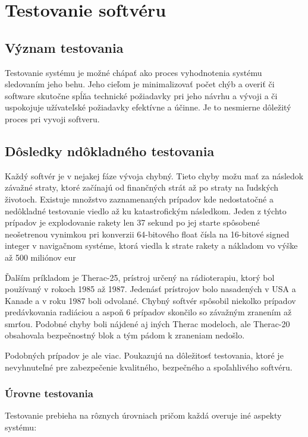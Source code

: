 \chapter{Testovanie softvéru}

\section{Význam testovania}

Testovanie systému je možné chápať ako proces vyhodnotenia systému sledovaním jeho behu. Jeho cieľom je minimalizovať počet chýb a overiť  či software skutočne spĺňa technické požiadavky pri jeho návrhu a vývoji a či uspokojuje užívateľské požiadavky efektívne a účinne. Je to nesmierne dôležitý proces pri vyvoji softveru.


\section{Dôsledky ndôkladného testovania}
Každý softvér je v nejakej fáze vývoja chybný. Tieto chyby možu mať za následok závažné straty, ktoré začínajú od finančných strát až po straty na ľudských životoch. Existuje množstvo zaznamenaných prípadov kde nedostatočné a nedôkladné testovanie viedlo až ku katastrofickým následkom.
Jeden z týchto prípadov je explodovanie rakety len 37 sekund po jej starte spôsobené neošetrenou vynimkou pri konverzii 64-bitového float čísla na 16-bitové signed integer v navigačnom systéme, ktorá viedla k strate rakety a nákladom vo výške až 500 miliónov eur\cite{Smrcka2024}

Ďalším príkladom je Therac-25, prístroj určený na rádioterapiu, ktorý bol používaný v rokoch 1985 až 1987.  Jedenásť prístrojov bolo nasadených v USA a Kanade a v roku 1987 boli odvolané. Chybný softvér spôsobil niekolko prípadov predávkovania radiáciou a aspoň 6 prípadov skončilo so závažným zranením až smrťou. Podobné chyby boli nájdené aj iných Therac modeloch, ale Therac-20 obsahovala bezpečnostný blok a tým pádom k zraneniam nedošlo.\cite{Leveson1993}

Podobných prípadov je ale viac. Poukazujú na dôležitosť testovania, ktoré je nevyhnuteľné pre zabezpečenie kvalitného, bezpečného a spoľahlivého softvéru.


\subsection{Úrovne testovania}\cite{Smrcka2024}

Testovanie prebieha na rôznych úrovniach pričom každá overuje iné aspekty systému:

